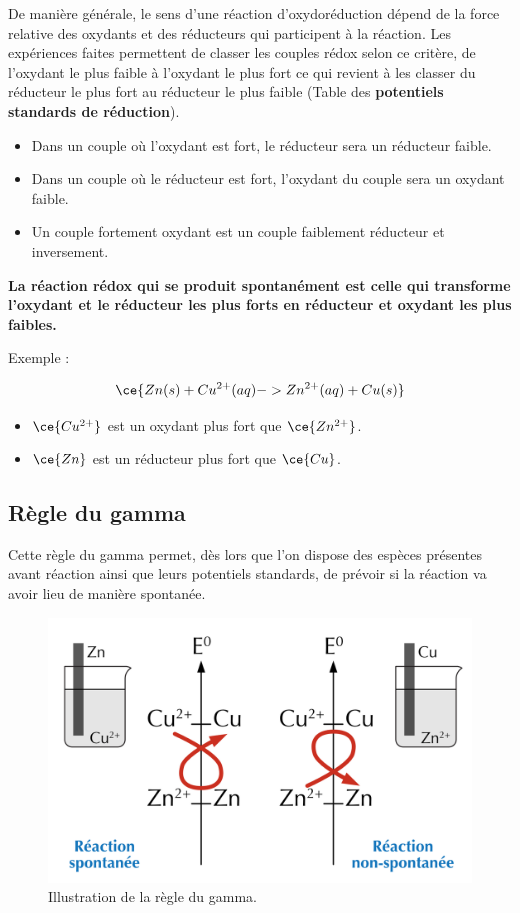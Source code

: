 \documentclass[
  11pt,
  a4paper,
  openany]{book}
\providecommand{\tightlist}{%
  \setlength{\itemsep}{0pt}\setlength{\parskip}{0pt}}
\begin{document}
De manière générale, le sens d'une réaction d'oxydoréduction dépend de la force relative des oxydants et des réducteurs qui participent à la réaction. Les expériences faites permettent de classer les couples rédox selon ce critère, de l'oxydant le plus faible à l'oxydant le plus fort ce qui revient à les classer du réducteur le plus fort au réducteur le plus faible (Table des \textbf{potentiels standards de réduction}).

\begin{itemize}
\tightlist
\item
  Dans un couple où l'oxydant est fort, le réducteur sera un réducteur faible.
\item
  Dans un couple où le réducteur est fort, l'oxydant du couple sera un oxydant faible.
\item
  Un couple fortement oxydant est un couple faiblement réducteur et inversement.
\end{itemize}

\textbf{La réaction rédox qui se produit spontanément est celle qui transforme l'oxydant et le réducteur les plus forts en réducteur et oxydant les plus faibles.}

Exemple :

\[
\ce{Zn(s) + Cu^{2+}(aq) -> Zn^{2+}(aq) + Cu(s)}
\]

\begin{itemize}
\tightlist
\item
  \(\ce{Cu^{2+}}\) est un oxydant plus fort que \(\ce{Zn^{2+}}\).
\item
  \(\ce{Zn}\) est un réducteur plus fort que \(\ce{Cu}\).
\end{itemize}

\subsection{Règle du gamma}\label{ruxe8gle-du-gamma}

Cette règle du gamma permet, dès lors que l'on dispose des espèces présentes avant réaction ainsi que leurs potentiels standards, de prévoir si la réaction va avoir lieu de manière spontanée.

\begin{figure}

{\centering \includegraphics[width=0.45\linewidth]{images/gamma-rule} 

}

\caption{Illustration de la règle du gamma.}\label{fig:gamma-rule}
\end{figure}
\end{document}
